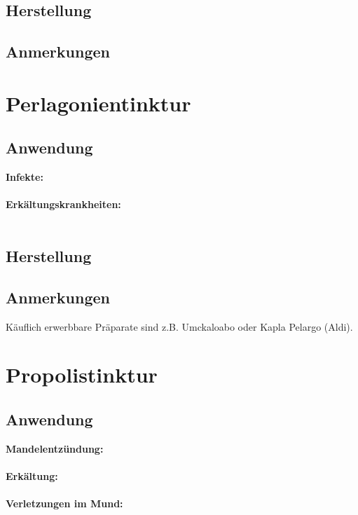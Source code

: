 \subsection{Herstellung}

\subsection{Anmerkungen}





\section{Perlagonientinktur}

\subsection{Anwendung}

\textbf{Infekte:} \\ \\
\textbf{Erkältungskrankheiten:} \\ \\


\subsection{Herstellung}

\subsection{Anmerkungen}

Käuflich erwerbbare Präparate sind z.B. Umckaloabo oder Kapla Pelargo (Aldi).



\section{Propolistinktur}

\subsection{Anwendung}

\textbf{Mandelentzündung:} \\ \\
\textbf{Erkältung:} \\ \\
\textbf{Verletzungen im Mund:} \\ \\


